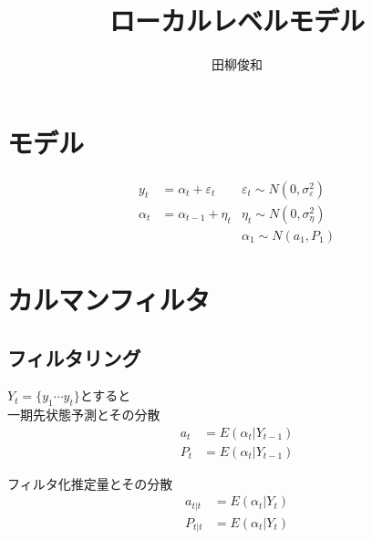 \documentclass[uplatex]{jsarticle}
\begin{document}
\title{ローカルレベルモデル}
\author{田柳俊和}
\maketitle
\section{モデル}
\begin{align*}
  y_{t}&=\alpha_{t}+\varepsilon_{t} &\varepsilon_{t} \sim N(0,\sigma_{\varepsilon}^{2})\\
  \alpha_{t}&=\alpha_{t-1}+\eta_{t} &\eta_{t} \sim N(0,\sigma_{\eta}^{2})\\
									   & &\alpha_{1} \sim N(a_{1},P_{1})
\end{align*}
\section{カルマンフィルタ}
\subsection{フィルタリング}
$Y_{t}=\{y_{1} \cdots y_{t}\}$とすると\\
一期先状態予測とその分散
\begin{align*}
  a_{t}&=E(\alpha_{t}|Y_{t-1})\\
  P_{t}&=E(\alpha_{t}|Y_{t-1})
\end{align*}

フィルタ化推定量とその分散
\begin{align*}
  a_{t|t}&=E(\alpha_{t}|Y_{t})\\
  P_{t|t}&=E(\alpha_{t}|Y_{t})
\end{align*}
\end{document}
